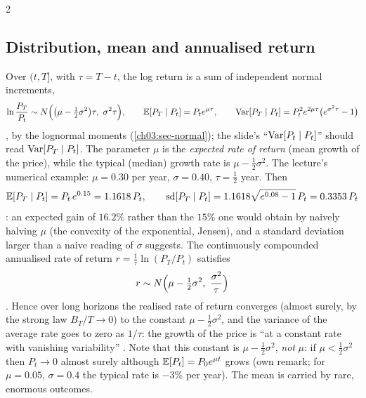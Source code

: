 \begin{paracol}{2}
\subsection{Distribution, mean and annualised return}\label{ch17:sec-gbmdist}
Over $(t,T]$, with $\tau=T-t$, the log return is a sum of independent normal increments,
\begin{equation}\label{ch17:eq-logret}
  \ln\frac{P_T}{P_t}\sim N\Bigl(\bigl(\mu-\tfrac12\sigma^2\bigr)\tau,\ \sigma^2\tau\Bigr),\qquad
  \E[P_T\mid P_t]=P_te^{\mu\tau},\qquad \Var[P_T\mid P_t]=P_t^2e^{2\mu\tau}\bigl(e^{\sigma^2\tau}-1\bigr)
\end{equation}
, by the lognormal moments (\cref{ch03:sec-normal}); the slide's ``$\operatorname{Var}[P_t\mid P_t]$'' should read $\operatorname{Var}[P_T\mid P_t]$.
The parameter $\mu$ is the \emph{expected rate of return} (mean growth of the price), while the typical (median) growth rate is $\mu-\tfrac12\sigma^2$. The lecture's numerical example:
$\mu=0.30$ per year, $\sigma=0.40$, $\tau=\tfrac12$ year. Then
\[
  \mathbb{E}[P_T\mid P_t]=P_t\,e^{0.15}=1.1618\,P_t,\qquad \operatorname{sd}[P_T\mid P_t]=1.1618\sqrt{e^{0.08}-1}\,P_t=0.3353\,P_t
\]
: an expected gain of $16.2\%$ rather than the $15\%$ one would obtain by naively halving $\mu$ (the convexity of the exponential, Jensen), and a standard deviation larger than a naive reading of $\sigma$ suggests.
The continuously compounded annualised rate of return $r=\tfrac1\tau\ln(P_T/P_t)$ satisfies
\begin{equation}\label{ch17:eq-rate}
  r\sim N\Bigl(\mu-\tfrac12\sigma^2,\ \frac{\sigma^2}{\tau}\Bigr)
\end{equation}
. Hence over long horizons the realised rate of return converges (almost surely, by the strong law $B_T/T\to0$) to the constant $\mu-\tfrac12\sigma^2$, and the variance of the average rate goes to zero as $1/\tau$:
the growth of the price is ``at a constant rate with vanishing variability'' . Note that this constant is $\mu-\tfrac12\sigma^2$, \emph{not} $\mu$: if $\mu<\tfrac12\sigma^2$ then $P_t\to0$
almost surely although $\mathbb{E}[P_t]=P_0e^{\mu t}$ grows (own remark; for $\mu=0.05$, $\sigma=0.4$ the typical rate is $-3\%$ per year). The mean is carried by rare, enormous outcomes.


\end{paracol}
